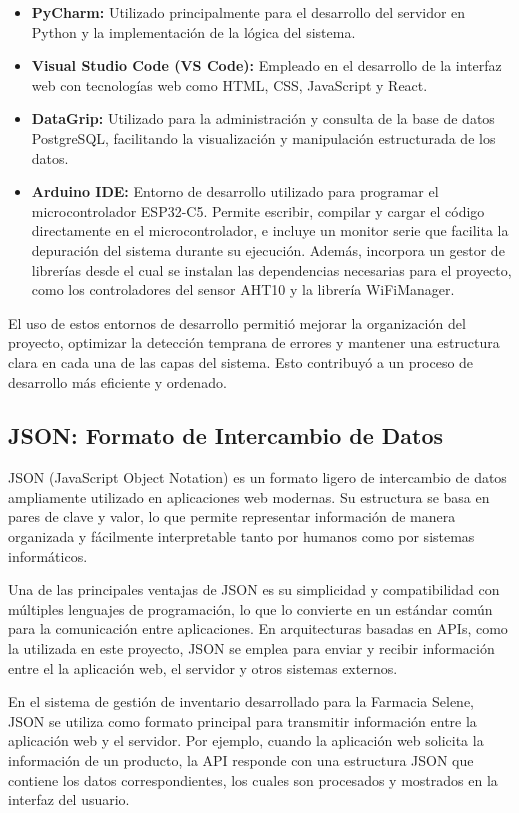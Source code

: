 \begin{itemize}
    \item \textbf{PyCharm:} Utilizado principalmente para el desarrollo del servidor en Python y la implementación de la lógica del sistema.
    \item \textbf{Visual Studio Code (VS Code):} Empleado en el desarrollo de la interfaz web con tecnologías web como HTML, CSS, JavaScript y React.
    \item \textbf{DataGrip:} Utilizado para la administración y consulta de la base de datos PostgreSQL, facilitando la visualización y manipulación estructurada de los datos.
    \item \textbf{Arduino IDE:} Entorno de desarrollo utilizado para programar el microcontrolador ESP32-C5. Permite escribir, compilar y cargar el código directamente en el microcontrolador, e incluye un monitor serie que facilita la depuración del sistema durante su ejecución. Además, incorpora un gestor de librerías desde el cual se instalan las dependencias necesarias para el proyecto, como los controladores del sensor AHT10 y la librería WiFiManager.
\end{itemize}

El uso de estos entornos de desarrollo permitió mejorar la organización del proyecto, optimizar la detección temprana de errores y mantener una estructura clara en cada una de las capas del sistema. Esto contribuyó a un proceso de desarrollo más eficiente y ordenado.

\subsection{JSON: Formato de Intercambio de Datos}

JSON (JavaScript Object Notation) es un formato ligero de intercambio de datos ampliamente utilizado en aplicaciones web modernas. Su estructura se basa en pares de clave y valor, lo que permite representar información de manera organizada y fácilmente interpretable tanto por humanos como por sistemas informáticos.

Una de las principales ventajas de JSON es su simplicidad y compatibilidad con múltiples lenguajes de programación, lo que lo convierte en un estándar común para la comunicación entre aplicaciones. En arquitecturas basadas en APIs, como la utilizada en este proyecto, JSON se emplea para enviar y recibir información entre el la aplicación web, el servidor y otros sistemas externos.

En el sistema de gestión de inventario desarrollado para la Farmacia Selene, JSON se utiliza como formato principal para transmitir información entre la aplicación web y el servidor. Por ejemplo, cuando la aplicación web solicita la información de un producto, la API responde con una estructura JSON que contiene los datos correspondientes, los cuales son procesados y mostrados en la interfaz del usuario.

